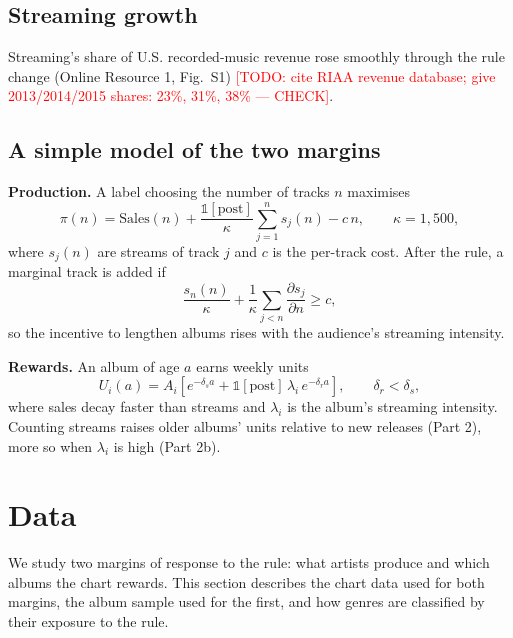 \documentclass[pdflatex,sn-apa]{sn-jnl}
\newcommand{\todo}[1]{\textcolor{red}{[TODO: #1]}}
\begin{document}
\subsection{Streaming growth}\label{subsec:riaa}
Streaming's share of U.S. recorded-music revenue rose smoothly through the rule change (Online Resource 1, Fig.~S1) \todo{cite RIAA revenue database; give 2013/2014/2015 shares: 23\%, 31\%, 38\% --- CHECK}.

\subsection{A simple model of the two margins}\label{subsec:model}
\textbf{Production.} A label choosing the number of tracks $n$ maximises
\begin{equation}
\pi(n) = \mathrm{Sales}(n) + \frac{\mathbb{1}[\text{post}]}{\kappa}\sum_{j=1}^{n} s_j(n) - c\,n, \qquad \kappa = 1{,}500,
\label{eq:model_prod}
\end{equation}
where $s_j(n)$ are streams of track $j$ and $c$ is the per-track cost. After the rule, a marginal track is added if
\begin{equation}
\frac{s_n(n)}{\kappa} + \frac{1}{\kappa}\sum_{j<n}\frac{\partial s_j}{\partial n} \geq c ,
\label{eq:model_foc}
\end{equation}
so the incentive to lengthen albums rises with the audience's streaming intensity.

\textbf{Rewards.} An album of age $a$ earns weekly units
\begin{equation}
U_i(a) = A_i\left[e^{-\delta_s a} + \mathbb{1}[\text{post}]\,\lambda_i\,e^{-\delta_r a}\right], \qquad \delta_r < \delta_s ,
\label{eq:model_units}
\end{equation}
where sales decay faster than streams and $\lambda_i$ is the album's streaming intensity. Counting streams raises older albums' units relative to new releases (Part 2), more so when $\lambda_i$ is high (Part 2b).

\section{Data}\label{sec:data}

We study two margins of response to the rule: what artists produce and which albums the chart rewards. This section describes the chart data used for both margins, the album sample used for the first, and how genres are classified by their exposure to the rule.
\end{document}
